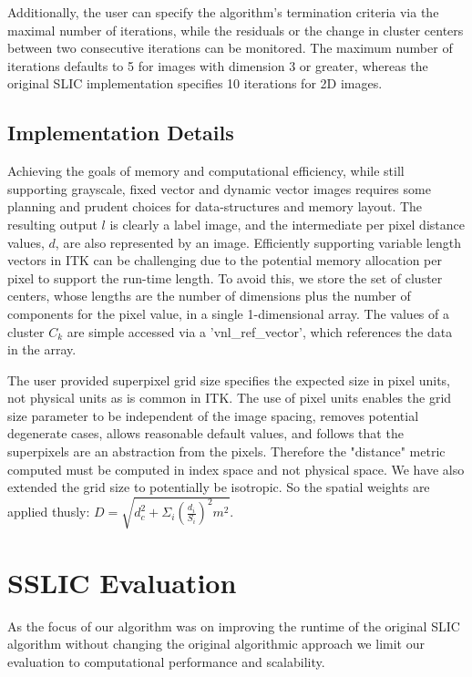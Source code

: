 \documentclass{InsightArticle}
\begin{document}
Additionally, the user can specify the algorithm's termination criteria via the
maximal number of iterations, while the residuals or the change in cluster centers between two consecutive iterations can be monitored. The maximum number of iterations defaults to 5 for images with dimension 3 or greater, whereas the original SLIC implementation specifies 10 iterations for 2D images.


\subsection{Implementation Details}

Achieving the goals of memory and computational efficiency, while still supporting
grayscale, fixed vector and dynamic vector images requires some planning
and prudent choices for data-structures and memory layout. The resulting output
$l$ is clearly a label image, and the intermediate per pixel distance values,
$d$, are also represented by an image. Efficiently supporting variable length vectors in
ITK can be challenging due to the potential memory allocation per pixel to
support the run-time length. To avoid this, we store the set of cluster centers,
whose lengths are the number of dimensions plus the number of components for the
pixel value, in a single 1-dimensional array. The values of a cluster $C_k$ are
simple accessed via a 'vnl\_ref\_vector', which references the data in the array.


The user provided superpixel grid size specifies the expected size in pixel
units, not physical units as is common in ITK. The use of pixel units enables the grid
size parameter to be independent of the image spacing, removes potential
degenerate cases, allows reasonable default values, and follows that the
superpixels are an abstraction from the pixels. Therefore the "distance" metric
computed must be computed in index space and not physical space. We have also
extended the grid size to potentially be isotropic. So the spatial weights are
applied thusly: $D=\sqrt{d_c^2+\Sigma_{i}\left(\frac{d_i}{S_i}\right)^2m^2}$.



\section{SSLIC Evaluation}

As the focus of our algorithm was on improving the runtime of the original
SLIC algorithm without changing the original algorithmic approach we limit 
our evaluation to computational performance and scalability. 
\end{document}
